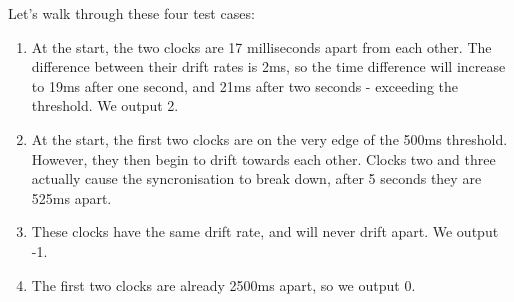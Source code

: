 Let's walk through these four test cases:

\begin{enumerate}
    \item At the start, the two clocks are 17 milliseconds apart from each other. 
    The difference between their drift rates is 2ms, so the time difference will increase to 19ms after one second, and 21ms after two seconds - exceeding the threshold.
    We output 2.
    \item At the start, the first two clocks are on the very edge of the 500ms threshold. 
    However, they then begin to drift towards each other.
    Clocks two and three actually cause the syncronisation to break down, after 5 seconds they are 525ms apart.
    \item These clocks have the same drift rate, and will never drift apart. We output -1.
    \item The first two clocks are already 2500ms apart, so we output 0.
    
\end{enumerate}